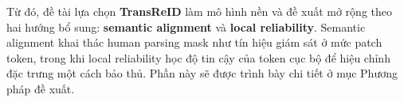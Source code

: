 Từ đó, đề tài lựa chọn \textbf{TransReID}
\cite{he2021transreidtransformerbasedobjectreidentification} làm mô hình nền và
đề xuất mở rộng theo hai hướng bổ sung: \textbf{semantic alignment} và
\textbf{local reliability}. Semantic alignment khai thác human parsing mask như
tín hiệu giám sát ở mức patch token, trong khi local reliability học độ tin cậy
của token cục bộ để hiệu chỉnh đặc trưng một cách bảo thủ. Phần này sẽ được
trình bày chi tiết ở mục Phương pháp đề xuất.
